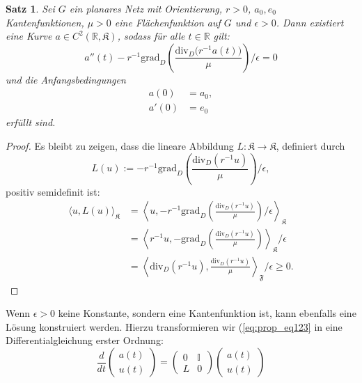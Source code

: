\documentclass[11pt,a4paper,leqno]{report}
\newtheorem{proposition}{Satz}[chapter]
\numberwithin{equation}{chapter}
\begin{document}
\begin{proposition}
	Sei \( G \) ein planares Netz mit Orientierung, \( r > 0 \), \( a_0, e_0 \) Kantenfunktionen, \(\mu > 0\) eine Flächenfunktion auf \(G\) und \(\epsilon > 0\). Dann existiert eine Kurve \( a \in C^2(\mathbb{R}, \mathfrak{K}) \), sodass für alle \( t \in \mathbb{R} \) gilt:
	\begin{equation}
		a''(t) - r^{-1} \mathrm{grad}_D \left( \frac{\mathrm{div}_D \bigl( r^{-1} a(t) \bigr)}{\mu} \right) / \epsilon = 0\label{eq:prop_eq123}
	\end{equation}
	und die Anfangsbedingungen
	\begin{align}
		a(0) &= a_0, \\
		a'(0) &= e_0
	\end{align}
	erfüllt sind.
\end{proposition}
\begin{proof}
	Es bleibt zu zeigen, dass die lineare Abbildung \( L : \mathfrak{K} \to \mathfrak{K} \), definiert durch
	\[
	L(u) := - r^{-1} \mathrm{grad}_D \left( \frac{\mathrm{div}_D (r^{-1} u)}{\mu} \right) / \epsilon,
	\]
	positiv semidefinit ist:
	\begin{align*}
		\langle u, L(u) \rangle_{\mathfrak{K}} 
		&= \left\langle u, -r^{-1} \mathrm{grad}_D \left( \frac{\mathrm{div}_D (r^{-1} u)}{\mu} \right) / \epsilon \right\rangle_{\mathfrak{K}} \\
		&= \left\langle r^{-1} u, - \mathrm{grad}_D \left( \frac{\mathrm{div}_D (r^{-1} u)}{\mu} \right) \right\rangle_{\mathfrak{K}} / \epsilon \\
		&= \left\langle \mathrm{div}_D (r^{-1} u), \frac{\mathrm{div}_D (r^{-1} u)}{\mu} \right\rangle_{\mathfrak{F}} / \epsilon \geq 0.
	\end{align*}
\end{proof}
\noindent
Wenn \(\epsilon > 0\) keine Konstante, sondern eine Kantenfunktion ist, kann ebenfalls eine Lösung konstruiert werden. Hierzu transformieren wir (\eqref{eq:prop_eq123} in eine Differentialgleichung erster Ordnung:
\begin{equation}
	\frac{d}{dt}
	\begin{pmatrix}
		a(t) \\
		u(t)
	\end{pmatrix}
	=
	\begin{pmatrix}
		0 & \mathbb{I} \\
		L & 0
	\end{pmatrix}
	\begin{pmatrix}
		a(t) \\
		u(t)
	\end{pmatrix}
\end{equation}
\end{document}
